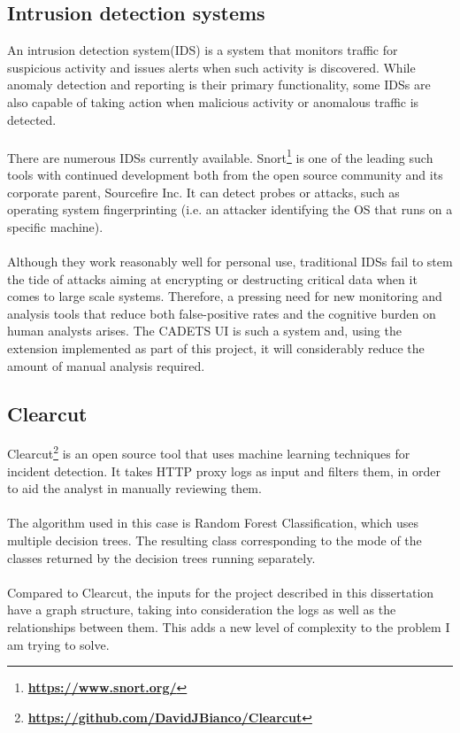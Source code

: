 	\subsection{Intrusion detection systems}
	An intrusion detection system(IDS) is a system that monitors traffic for suspicious activity and issues alerts when such activity is discovered. While anomaly detection and reporting is their primary functionality, some IDSs are also capable of taking action when malicious activity or anomalous traffic is detected. 
	\\ \\
	There are numerous IDSs currently available. Snort\footnote{\textbf{\url{https://www.snort.org/}}} is one of the leading such tools with continued development both from the open source community and its corporate parent, Sourcefire Inc. It can detect probes or attacks, such as operating system fingerprinting (i.e. an attacker identifying the OS that runs on a specific machine). 
	\\ \\
	Although they work reasonably well for personal use, traditional IDSs fail to stem the tide of attacks aiming at encrypting or destructing critical data when it comes to large scale systems. Therefore, a pressing need for new monitoring and analysis tools that reduce both false-positive rates and the cognitive burden on human analysts arises. The CADETS UI is such a system and, using the extension implemented as part of this project, it will considerably reduce the amount of manual analysis required. 
	
	\subsection{Clearcut}
	Clearcut\footnote{\textbf{\url{https://github.com/DavidJBianco/Clearcut}}} is an open source tool that uses machine learning techniques for incident detection. It takes HTTP proxy logs as input and filters them, in order to aid the analyst in manually reviewing them. 
	\\ \\ 
	The algorithm used in this case is Random Forest Classification, which uses multiple decision trees. The resulting class corresponding to the mode of the classes returned by the decision trees running separately. 
	\\ \\
	Compared to Clearcut, the inputs for the project described in this dissertation have a graph structure, taking into consideration the logs as well as the relationships between them. This adds a new level of complexity to the problem I am trying to solve.
	
